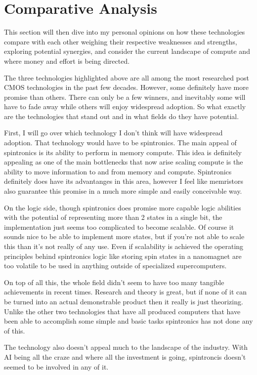 \documentclass[sigconf]{acmart}
\begin{document}
\section{Comparative Analysis}
This section will then dive into my personal opinions on how these 
technologies compare with each other weighing their respective 
weaknesses and strengths, exploring potential synergies, and consider 
the current landscape of compute and where money and effort is 
being directed. 

The three technologies highlighted above are all among the most 
researched post CMOS technologies in the past few decades. However, 
some definitely have more promise than others. There can 
only be a few winners, and inevitably some will have to fade away 
while others will enjoy widespread adoption. So what exactly are the 
technologies that stand out and in what fields do they have potential. 

First, I will go over which technology I don't think will have 
widespread adoption. That technology would have to be spintronics. 
The main appeal of spintronics is its ability to perform in memory compute. 
This idea is definitely appealing as one of the main bottlenecks that now arise 
scaling compute is the ability to move information to and from memory and compute. 
Spintronics definitely does have its advantanges in this area, however I feel like 
memristors also guarantee this promise in a much more simple and easily conceivable way. 

On the logic side, though spintronics does promise more capable logic abilities with 
the potential of representing more than 2 states in a single bit, the implementation 
just seems too complicated to become scalable. Of course it sounds nice to be able 
to implement more states, but if you're not able to scale this than it's not really 
of any use. Even if scalability is achieved the operating principles behind spintronics 
logic like storing spin states in a nanomagnet are too volatile to be used in anything 
outside of specialized supercomputers. 

On top of all this, the whole field didn't seem to have too many tangible achievements in 
recent times. Research and theory is great, but if none of it can be turned into an actual 
demonstrable product then it really is just theorizing. Unlike the other two technologies 
that have all produced computers that have been able to accomplish some simple and basic tasks
spintronics has not done any of this. 

The technology also doesn't appeal much to the landscape of the industry. With AI being 
all the craze and where all the investment is going, spintroncis doesn't seemed to 
be involved in any of it. 
\end{document}
